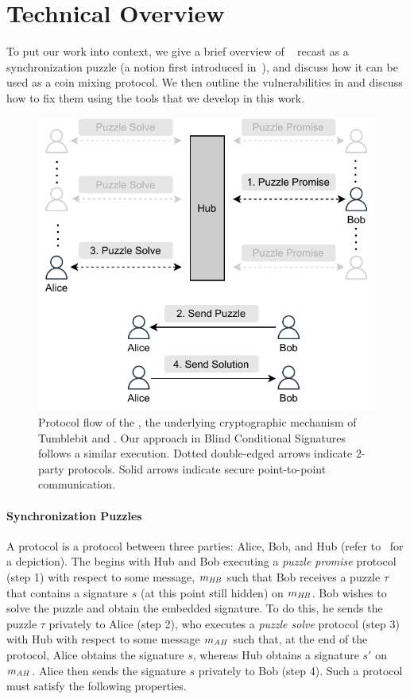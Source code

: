 \section{Technical Overview}

To put our work into context, we give a brief overview of \aal~\cite{SP:TaiMorMaf21} recast as a synchronization puzzle (a notion first introduced in~\cite{NDSS:HABSG17}), and discuss how it can be used as a coin mixing protocol. We then outline the vulnerabilities in \aal and discuss how to fix them using the tools that we develop in this work.

\begin{figure}[tbh]
    \centering
    \includegraphics{bcs/figs/bcs.pdf}
    \caption{Protocol flow of the \syncpuzzle, the underlying cryptographic mechanism of Tumblebit and \aal. Our approach in Blind Conditional Signatures follows a similar execution. Dotted double-edged arrows indicate 2-party protocols. Solid arrows indicate secure point-to-point communication.}
    \label{fig:sync_tool}
\end{figure}

\paragraph{Synchronization Puzzles} A \syncpuzzle protocol is a protocol between three parties: Alice, Bob, and Hub (refer to~ for a depiction). The \syncpuzzle begins with Hub and Bob executing a \emph{puzzle promise} protocol (step 1) with respect to some message, $m_{\mathit{HB}}$ such that Bob receives a puzzle $\tau$ that contains a signature $s$ (at this point still hidden) on $m_{\mathit{HB}}$. Bob wishes to solve the puzzle and obtain the embedded signature. To do this, he sends the puzzle $\tau$ privately to Alice (step 2), who executes a \emph{puzzle solve} protocol (step 3) with Hub with respect to some message $m_{\mathit{AH}}$ such that, at the end of the protocol, Alice obtains the signature $s$, whereas Hub obtains a signature $s'$ on $m_{\mathit{AH}}$.
Alice then sends the signature $s$ privately to Bob (step 4). Such a protocol must satisfy the following properties.

